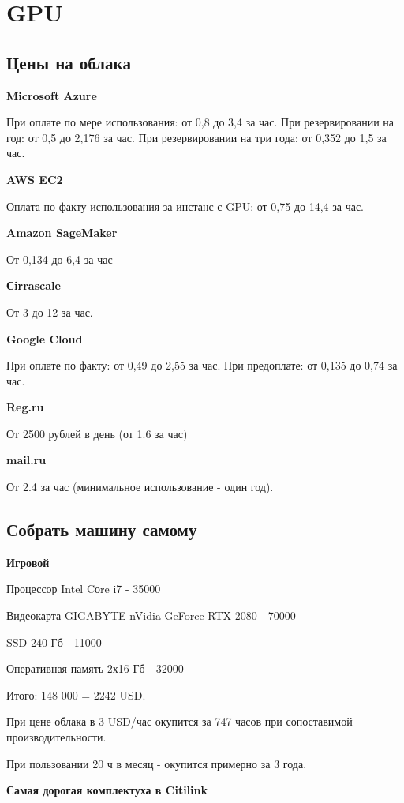 \chapter{GPU}
\label{cha:chapter}

\section{Цены на облака}

\textbf{Microsoft Azure}

При оплате по мере использования: от 0,8 до 3,4 за час.
При резервировании на год: от 0,5 до 2,176 за час.
При резервировании на три года: от 0,352 до 1,5 за час.

\textbf{AWS EC2}

Оплата по факту использования за инстанс с GPU: от 0,75 до 14,4 за час.

\textbf{Amazon SageMaker}

От 0,134 до 6,4 за час

\textbf{Сirrascale}

От 3 до 12 за час.

\textbf{Google Cloud}

При оплате по факту: от 0,49 до 2,55 за час.
При предоплате: от 0,135 до 0,74 за час.

\textbf{Reg.ru}

От 2500 рублей в день (от 1.6 за час)

\textbf{mail.ru}

От 2.4 за час (минимальное использование - один год).

\section{Собрать машину самому}

\textbf{Игровой}

Процессор Intel Cоre i7 - 35000

Видеокарта GIGABYTE nVidia GeForce RTX 2080 - 70000

SSD 240 Гб - 11000

Оперативная память 2х16 Гб - 32000

Итого: 148 000 = 2242 USD.

При цене облака в 3 USD/час окупится за 747 часов при сопоставимой производительности.

При пользовании 20 ч в месяц - окупится примерно за 3 года.

\textbf{Самая дорогая комплектуха в Citilink}

